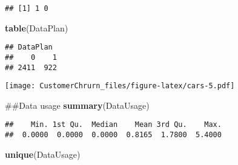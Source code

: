 \documentclass[]{article}
\newenvironment{Shaded}{\begin{snugshade}}{\end{snugshade}}
\newcommand{\KeywordTok}[1]{\textcolor[rgb]{0.13,0.29,0.53}{\textbf{#1}}}
\newcommand{\DataTypeTok}[1]{\textcolor[rgb]{0.13,0.29,0.53}{#1}}
\newcommand{\StringTok}[1]{\textcolor[rgb]{0.31,0.60,0.02}{#1}}
\newcommand{\CommentTok}[1]{\textcolor[rgb]{0.56,0.35,0.01}{\textit{#1}}}
\newcommand{\OperatorTok}[1]{\textcolor[rgb]{0.81,0.36,0.00}{\textbf{#1}}}
\newcommand{\NormalTok}[1]{#1}
\begin{document}
\begin{verbatim}
## [1] 1 0
\end{verbatim}

\begin{Shaded}
\begin{Highlighting}[]
\KeywordTok{table}\NormalTok{(DataPlan)}
\end{Highlighting}
\end{Shaded}

\begin{verbatim}
## DataPlan
##    0    1 
## 2411  922
\end{verbatim}

\begin{Shaded}
\end{Shaded}

\texttt{[image: CustomerChrurn\_files/figure-latex/cars-5.pdf]}

\begin{Shaded}
\begin{Highlighting}[]
\NormalTok{##Data usage}
\KeywordTok{summary}\NormalTok{(DataUsage)}
\end{Highlighting}
\end{Shaded}

\begin{verbatim}
##    Min. 1st Qu.  Median    Mean 3rd Qu.    Max. 
##  0.0000  0.0000  0.0000  0.8165  1.7800  5.4000
\end{verbatim}

\begin{Shaded}
\begin{Highlighting}[]
\KeywordTok{unique}\NormalTok{(DataUsage)}
\end{Highlighting}
\end{Shaded}
\end{document}
